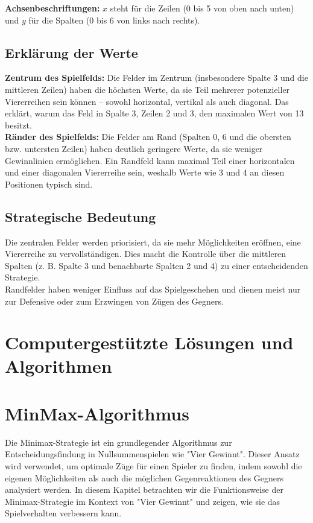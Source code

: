 	\textbf{Achsenbeschriftungen:} \(x\) steht für die Zeilen (0 bis 5 von oben nach unten) und \(y\) für die Spalten (0 bis 6 von links nach rechts).
	
	\subsection*{Erklärung der Werte}
	\textbf{Zentrum des Spielfelds:} Die Felder im Zentrum (insbesondere Spalte 3 und die mittleren Zeilen) haben die höchsten Werte, da sie Teil mehrerer potenzieller Viererreihen sein können – sowohl horizontal, vertikal als auch diagonal. Das erklärt, warum das Feld in Spalte 3, Zeilen 2 und 3, den maximalen Wert von 13 besitzt.\\
	
	\textbf{Ränder des Spielfelds:} Die Felder am Rand (Spalten 0, 6 und die obersten bzw. untersten Zeilen) haben deutlich geringere Werte, da sie weniger Gewinnlinien ermöglichen. Ein Randfeld kann maximal Teil einer horizontalen und einer diagonalen Viererreihe sein, weshalb Werte wie 3 und 4 an diesen Positionen typisch sind.
	
	\subsection*{Strategische Bedeutung}
	Die zentralen Felder werden priorisiert, da sie mehr Möglichkeiten eröffnen, eine Viererreihe zu vervollständigen. Dies macht die Kontrolle über die mittleren Spalten (z. B. Spalte 3 und benachbarte Spalten 2 und 4) zu einer entscheidenden Strategie.\\
	Randfelder haben weniger Einfluss auf das Spielgeschehen und dienen meist nur zur Defensive oder zum Erzwingen von Zügen des Gegners.
	
	
\section{Computergestützte Lösungen und Algorithmen}
	
	
\section{MinMax-Algorithmus}

Die Minimax-Strategie ist ein grundlegender Algorithmus zur Entscheidungsfindung in Nullsummenspielen wie "Vier Gewinnt". Dieser Ansatz wird verwendet, um optimale Züge für einen Spieler zu finden, indem sowohl die eigenen Möglichkeiten als auch die möglichen Gegenreaktionen des Gegners analysiert werden. In diesem Kapitel betrachten wir die Funktionsweise der Minimax-Strategie im Kontext von "Vier Gewinnt" und zeigen, wie sie das Spielverhalten verbessern kann.

